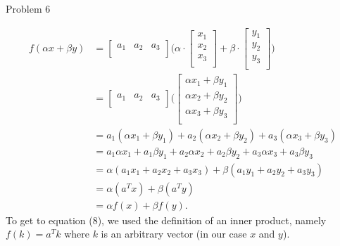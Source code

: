 \begin{problem}{Problem 6}
\begin{highlight}
        \begin{align}
            f(\alpha x + \beta y) & = 
            \begin{bmatrix}
                a_{1} & a_{2} & a_{3} \\
            \end{bmatrix}
            \Bigg(
            \alpha \cdot 
            \begin{bmatrix}
                x_{1} \\
                x_{2} \\
                x_{3} \\
            \end{bmatrix}
            + \beta \cdot
            \begin{bmatrix}
                y_{1} \\
                y_{2} \\
                y_{3} \\
            \end{bmatrix}
            \Bigg) \\
            & = 
            \begin{bmatrix}
                a_{1} & a_{2} & a_{3} \\
            \end{bmatrix}
            \Bigg(
            \begin{bmatrix}
                \alpha x_{1} + \beta y_{1} \\
                \alpha x_{2} + \beta y_{2} \\
                \alpha x_{3} + \beta y_{3} \\
            \end{bmatrix}
            \Bigg) \\
            & = a_{1}(\alpha x_{1} + \beta y_{1}) + a_{2}(\alpha x_{2} + \beta y_{2}) + a_{3}(\alpha x_{3} + \beta y_{3}) \\
            & = a_{1} \alpha x_{1} + a_{1} \beta y_{1} + a_{2} \alpha x_{2} + a_{2} \beta y_{2} + a_{3} \alpha x_{3} + a_{3} \beta y_{3} \\
            & = \alpha(a_{1}x_{1} + a_{2}x_{2} + a_{3}x_{3}) + \beta(a_{1}y_{1} + a_{2}y_{2} + a_{3}y_{3}) \\
            & = \alpha (a^{T}x) + \beta (a^{T}y) \\
            & = \alpha f(x) + \beta f(y).
        \end{align}
        To get to equation (8), we used the definition of an inner product, namely $f(k) = a^{T}k$ where $k$ is an arbitrary vector (in our case $x$ and $y$).


\end{highlight}
\end{problem}
